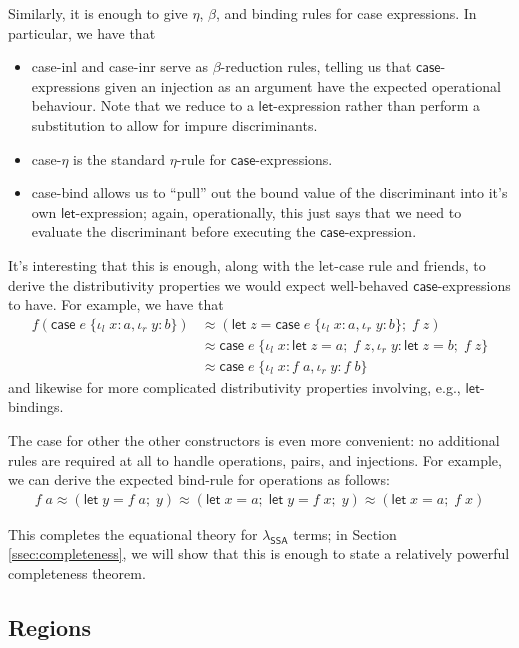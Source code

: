 \documentclass[acmsmall,screen,review]{acmart}
\newcommand{\ms}[1]{\ensuremath{\mathsf{#1}}}
\newcommand{\lto}{:}
\newcommand{\linl}[1]{\iota_l\;{#1}}
\newcommand{\linr}[1]{\iota_r\;{#1}}
\newcommand{\letexpr}[3]{\ensuremath{\ms{let}\;#1 = #2;\;#3}}
\newcommand{\caseexpr}[5]{\ms{case}\;#1\;\{\linl{#2} \lto #3, \linr{#4} \lto #5\}}
\newcommand{\teqv}{\approx}
\newcommand{\brle}[1]{{\textsf{#1}}}
\newcommand{\isotopessa}{\(\lambda_{\ms{SSA}}\)}
\begin{document}
Similarly, it is enough to give $\eta$, $\beta$, and binding rules for \brle{case} expressions. 
In particular, we have that
\begin{itemize}
  \item \brle{case-inl} and \brle{case-inr} serve as $\beta$-reduction rules, telling us that
  \ms{case}-expressions given an injection as an argument have the expected operational behaviour.
  Note that we reduce to a \ms{let}-expression rather than perform a substitution to allow for
  impure discriminants.
  \item \brle{case-$\eta$} is the standard $\eta$-rule for \ms{case}-expressions.
  \item \brle{case-bind} allows us to ``pull'' out the bound value of the discriminant into
  it's own \ms{let}-expression; again, operationally, this just says that we need to evaluate
  the discriminant before executing the \ms{case}-expression.
\end{itemize}
It's interesting that this is enough, along with the \brle{let-case} rule and friends, to derive the
distributivity properties we would expect well-behaved \ms{case}-expressions to have. For example,
we have that
\begin{align*}
  f(\caseexpr{e}{x}{a}{y}{b}) 
  &\teqv (\letexpr{z}{\caseexpr{e}{x}{a}{y}{b}}{f\;z}) \\
  &\teqv \caseexpr{e}{x}{\letexpr{z}{a}{f\;z}}{y}{\letexpr{z}{b}{f\;z}} \\
  &\teqv \caseexpr{e}{x}{f\;a}{y}{f\;b}
\end{align*}
and likewise for more complicated distributivity properties involving, e.g., \ms{let}-bindings.

The case for other the other constructors is even more convenient: no additional rules are required
at all to handle operations, pairs, and injections. For example, we can derive the expected
bind-rule for operations as follows:
\begin{align*}
  f\;a \teqv (\letexpr{y}{f\;a}{y})
  \teqv (\letexpr{x}{a}{\letexpr{y}{f\;x}{y}})
  \teqv (\letexpr{x}{a}{f\;x})
\end{align*}

This completes the equational theory for \isotopessa{} terms; in Section \ref{ssec:completeness}, we
will show that this is enough to state a relatively powerful completeness theorem.

\subsection{Regions}
\end{document}
